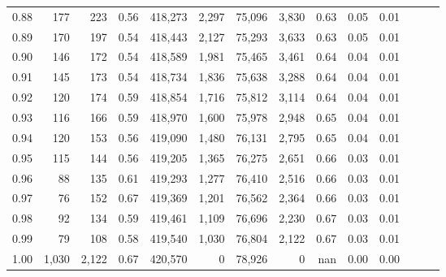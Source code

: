 \begin{tabular}{rrrrrrrrrrrrrr}
0.88 &     177 &    223 &  0.56 &  418,273 &    2,297 &  75,096 &   3,830 &  0.63 &  0.05 &      0.01 \\
0.89 &     170 &    197 &  0.54 &  418,443 &    2,127 &  75,293 &   3,633 &  0.63 &  0.05 &      0.01 \\
0.90 &     146 &    172 &  0.54 &  418,589 &    1,981 &  75,465 &   3,461 &  0.64 &  0.04 &      0.01 \\
0.91 &     145 &    173 &  0.54 &  418,734 &    1,836 &  75,638 &   3,288 &  0.64 &  0.04 &      0.01 \\
0.92 &     120 &    174 &  0.59 &  418,854 &    1,716 &  75,812 &   3,114 &  0.64 &  0.04 &      0.01 \\
0.93 &     116 &    166 &  0.59 &  418,970 &    1,600 &  75,978 &   2,948 &  0.65 &  0.04 &      0.01 \\
0.94 &     120 &    153 &  0.56 &  419,090 &    1,480 &  76,131 &   2,795 &  0.65 &  0.04 &      0.01 \\
0.95 &     115 &    144 &  0.56 &  419,205 &    1,365 &  76,275 &   2,651 &  0.66 &  0.03 &      0.01 \\
0.96 &      88 &    135 &  0.61 &  419,293 &    1,277 &  76,410 &   2,516 &  0.66 &  0.03 &      0.01 \\
0.97 &      76 &    152 &  0.67 &  419,369 &    1,201 &  76,562 &   2,364 &  0.66 &  0.03 &      0.01 \\
0.98 &      92 &    134 &  0.59 &  419,461 &    1,109 &  76,696 &   2,230 &  0.67 &  0.03 &      0.01 \\
0.99 &      79 &    108 &  0.58 &  419,540 &    1,030 &  76,804 &   2,122 &  0.67 &  0.03 &      0.01 \\
1.00 &   1,030 &  2,122 &  0.67 &  420,570 &        0 &  78,926 &       0 &   nan &  0.00 &      0.00 \\
\bottomrule
\end{tabular}
